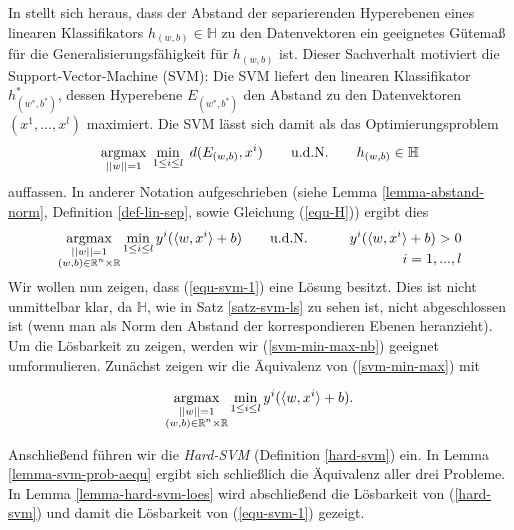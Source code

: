 In \cite{sb-umlfta} stellt sich heraus, dass der Abstand der separierenden Hyperebenen eines linearen Klassifikators $h_{(w,b)} \in \mathbb{H}$ zu den Datenvektoren ein geeignetes Gütemaß für die Generalisierungsfähigkeit für $h_{(w,b)}$ ist. Dieser Sachverhalt motiviert die Support-Vector-Machine (SVM): Die SVM liefert den linearen Klassifikator $h^*_{(w^*,b^*)}$, dessen Hyperebene $E_{(w^*,b^*)}$ den Abstand zu den Datenvektoren $(x^1,...,x^l)$ maximiert. Die SVM lässt sich damit als das Optimierungsproblem
\begin{equation}
	\label{equ-svm-1}
	\begin{aligned}
	\operatorname*{argmax}_{||w||=1} { \; \min_{1 \leq i \leq l}{ \; d(E_{(w,b)}, x^i) }} \qquad
					  \text{u.d.N.} \qquad h_{(w,b)} \in \mathbb{H}
 	\end{aligned}
\end{equation}
auffassen. In anderer Notation aufgeschrieben (siehe Lemma \ref{lemma-abstand-norm}, Definition \ref{def-lin-sep}, sowie Gleichung (\ref{equ-H})) ergibt dies
\begin{equation}
	\label{svm-min-max-nb}
	\begin{aligned}
		& \smash{ \operatorname*{argmax}_{\substack{||w||=1 \\ (w,b) \in \mathbb{R}^n \times \mathbb{R}}}{ 
			\min_{1\leq i \leq l}{y^i(\langle w, x^i \rangle + b)}
		}} \qquad \text{u.d.N.} \qquad &
		y^i(\langle w, x^i \rangle + b) > 0 \\ 
		&& i = 1,...,l
	\end{aligned}
\end{equation}
Wir wollen nun zeigen, dass (\ref{equ-svm-1}) eine Lösung besitzt. Dies ist nicht unmittelbar klar, da $\mathbb{H}$, wie in Satz \ref{satz-svm-ls} zu sehen ist, nicht abgeschlossen ist (wenn man als Norm den Abstand der korrespondieren Ebenen heranzieht). Um die Lösbarkeit zu zeigen, werden wir (\ref{svm-min-max-nb}) geeignet umformulieren. Zunächst zeigen wir die Äquivalenz von (\ref{svm-min-max}) mit

\begin{equation}
\label{svm-min-max}
\begin{aligned}
	\operatorname*{argmax}_{\substack{||w||=1 \\ (w,b) \in \mathbb{R}^n \times \mathbb{R}}}{
		\min_{1\leq i \leq l}{y^i(\langle w, x^i \rangle + b)}
	}.
\end{aligned}
\end{equation}

Anschließend führen wir die \emph{Hard-SVM} (Definition \ref{hard-svm}) ein. In Lemma \ref{lemma-svm-prob-aequ} ergibt sich schließlich die Äquivalenz aller drei Probleme. In Lemma \ref{lemma-hard-svm-loes} wird abschließend die Lösbarkeit von (\ref{hard-svm}) und damit die Lösbarkeit von (\ref{equ-svm-1}) gezeigt.

